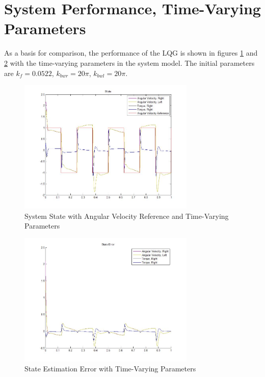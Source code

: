 \documentclass[letterpaper,12pt]{report}
\begin{document}
\section{System Performance, Time-Varying Parameters}
As a basis for comparison, the performance of the LQG is shown in figures \ref{fig:ssTVpDiagram1} and \ref{fig:seTVpDiagram1} with the time-varying parameters in the system model.
The initial parameters are $k_f = 0.0522$, $k_{bwr} = 20\pi$, $k_{bwl} = 20\pi$.
\begin{figure}[h]
	\centering
	\includegraphics[width=0.75\textwidth]{TV_State1.jpg}
	\caption{System State with Angular Velocity Reference and Time-Varying Parameters}
	\label{fig:ssTVpDiagram1}
\end{figure}
\begin{figure}[h]
	\centering
	\includegraphics[width=0.75\textwidth]{TV_StateError1.jpg}
	\caption{State Estimation Error with Time-Varying Parameters}
	\label{fig:seTVpDiagram1}
\end{figure}
 
\end{document}
